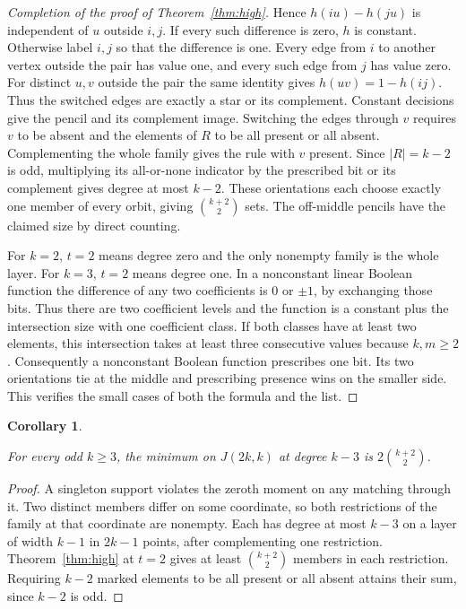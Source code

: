\documentclass[11pt,letterpaper]{article}
\newtheorem{corollary}[theorem]{Corollary}
\numberwithin{equation}{section}
\begin{document}
\begin{proof}[Completion of the proof of Theorem~\ref{thm:high}]
Hence $h(iu)-h(ju)$ is independent of $u$ outside $i,j$. If every such difference is zero, $h$
is constant. Otherwise label $i,j$ so that the difference is one. Every edge from $i$ to
another vertex outside the pair has value one, and every such edge from $j$ has value zero.
For distinct $u,v$ outside the pair the same identity gives $h(uv)=1-h(ij)$. Thus the switched
edges are exactly a star or its complement. Constant decisions give the pencil and its
complement image. Switching the edges through $v$ requires $v$ to be absent and the elements
of $R$ to be all present or all absent. Complementing the whole family gives the rule with $v$
present. Since $|R|=k-2$ is odd, multiplying its all-or-none indicator by the prescribed bit
or its complement gives degree at most $k-2$. These orientations each choose exactly one
member of every orbit, giving $\binom{k+2}{2}$ sets. The off-middle pencils have the claimed
size by direct counting.

For $k=2$, $t=2$ means degree zero and the only nonempty family is the whole layer. For $k=3$,
$t=2$ means degree one. In a nonconstant linear Boolean function the difference of any two
coefficients is $0$ or $\pm1$, by exchanging those bits. Thus there are two coefficient levels
and the function is a constant plus the intersection size with one coefficient class. If both
classes have at least two elements, this intersection takes at least three consecutive values
because $k,m\ge2$. Consequently a nonconstant Boolean function prescribes one bit. Its two
orientations tie at the middle and prescribing presence wins on the smaller side. This
verifies the small cases of both the formula and the list.
\end{proof}

\begin{corollary}\label{cor:odd}

For every odd $k\ge3$, the minimum on $J(2k,k)$ at degree $k-3$ is $2\binom{k+2}{2}$.
\end{corollary}

\begin{proof}

A singleton support violates the zeroth moment on any matching through it. Two distinct
members differ on some coordinate, so both restrictions of the family at that coordinate are
nonempty. Each has degree at most $k-3$ on a layer of width $k-1$ in $2k-1$ points, after
complementing one restriction. Theorem~\ref{thm:high} at $t=2$ gives at least $\binom{k+2}{2}$
members in each restriction. Requiring $k-2$ marked elements to be all present or all absent
attains their sum, since $k-2$ is odd.
\end{proof}
\end{document}
